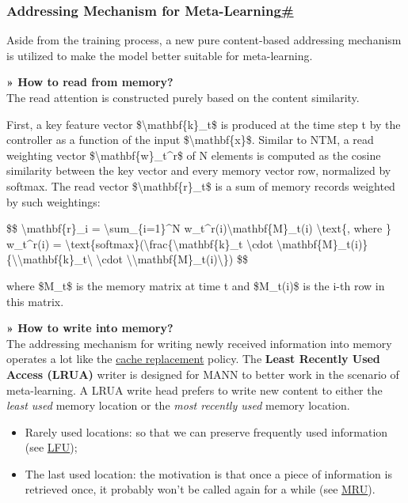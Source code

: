 \subsubsection{\texorpdfstring{Addressing Mechanism for Meta-Learning\hyperref[addressing-mechanism-for-meta-learning]{\#}}{Addressing Mechanism for Meta-Learning\#}}\label{addressing-mechanism-for-meta-learning}

Aside from the training process, a new pure content-based addressing mechanism is utilized to make the model better suitable for meta-learning.

\textbf{» How to read from memory?}\\
The read attention is constructed purely based on the content similarity.

First, a key feature vector \$\textbackslash mathbf\{k\}\_t\$ is produced at the time step t by the controller as a function of the input \$\textbackslash mathbf\{x\}\$. Similar to NTM, a read weighting vector \$\textbackslash mathbf\{w\}\_t\^{}r\$ of N elements is computed as the cosine similarity between the key vector and every memory vector row, normalized by softmax. The read vector \$\textbackslash mathbf\{r\}\_t\$ is a sum of memory records weighted by such weightings:

\$\$ \textbackslash mathbf\{r\}\_i = \textbackslash sum\_\{i=1\}\^{}N w\_t\^{}r(i)\textbackslash mathbf\{M\}\_t(i) \textbackslash text\{, where \} w\_t\^{}r(i) = \textbackslash text\{softmax\}(\textbackslash frac\{\textbackslash mathbf\{k\}\_t \textbackslash cdot \textbackslash mathbf\{M\}\_t(i)\}\{\textbackslash\textbar\textbackslash mathbf\{k\}\_t\textbackslash\textbar{} \textbackslash cdot \textbackslash\textbar\textbackslash mathbf\{M\}\_t(i)\textbackslash\textbar\}) \$\$

where \$M\_t\$ is the memory matrix at time t and \$M\_t(i)\$ is the i-th row in this matrix.

\textbf{» How to write into memory?}\\
The addressing mechanism for writing newly received information into memory operates a lot like the \href{https://en.wikipedia.org/wiki/Cache_replacement_policies}{cache replacement} policy. The \textbf{Least Recently Used Access (LRUA)} writer is designed for MANN to better work in the scenario of meta-learning. A LRUA write head prefers to write new content to either the \emph{least used} memory location or the \emph{most recently used} memory location.

\begin{itemize}
\tightlist
\item
  Rarely used locations: so that we can preserve frequently used information (see \href{https://en.wikipedia.org/wiki/Least_frequently_used}{LFU});
\item
  The last used location: the motivation is that once a piece of information is retrieved once, it probably won't be called again for a while (see \href{https://en.wikipedia.org/wiki/Cache_replacement_policies\#Most_recently_used_(MRU)}{MRU}).
\end{itemize}

